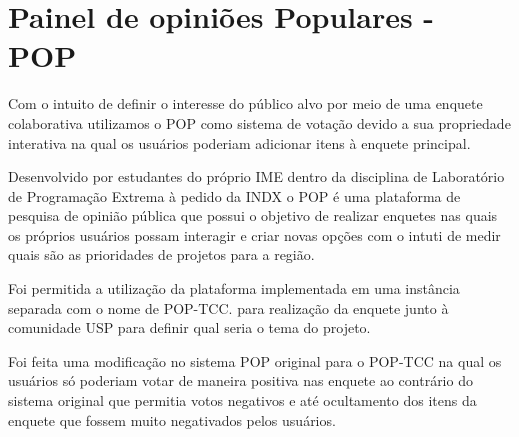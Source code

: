 \section{Painel de opiniões Populares - POP}
\par Com o intuito de definir o interesse do público alvo por meio de uma enquete colaborativa utilizamos o POP como sistema de votação devido a sua propriedade interativa na qual os usuários poderiam adicionar itens à enquete principal.
\par Desenvolvido por estudantes do próprio IME dentro da disciplina de Laboratório de Programação Extrema à pedido da INDX o POP é uma plataforma de pesquisa de opinião pública que possui o objetivo de realizar enquetes nas quais os próprios usuários possam interagir e criar novas opções com o intuti de medir quais são as prioridades de projetos para a região.
\par Foi permitida a utilização da plataforma implementada em uma instância separada com o nome de POP-TCC. para realização da enquete junto à comunidade USP para definir qual seria o tema do projeto.
\par Foi feita uma modificação no sistema POP original para o POP-TCC na qual os usuários só poderiam votar de maneira positiva nas enquete ao contrário do sistema original que permitia votos negativos e até ocultamento dos itens da enquete que fossem muito negativados pelos usuários.

